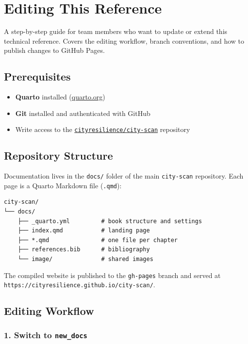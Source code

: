 \documentclass[
  letterpaper,
  DIV=11,
  numbers=noendperiod]{scrreprt}
\providecommand{\tightlist}{%
  \setlength{\itemsep}{0pt}\setlength{\parskip}{0pt}}
\begin{document}
\chapter{Editing This Reference}\label{editing-this-reference}

A step-by-step guide for team members who want to update or extend this
technical reference. Covers the editing workflow, branch conventions,
and how to publish changes to GitHub Pages.

\section{Prerequisites}\label{prerequisites}

\begin{itemize}
\tightlist
\item
  \textbf{Quarto} installed
  (\href{https://quarto.org/docs/get-started/}{quarto.org})
\item
  \textbf{Git} installed and authenticated with GitHub
\item
  Write access to the
  \href{https://github.com/cityresilience/city-scan}{\texttt{cityresilience/city-scan}}
  repository
\end{itemize}

\section{Repository Structure}\label{repository-structure-1}

Documentation lives in the \texttt{docs/} folder of the main
\texttt{city-scan} repository. Each page is a Quarto Markdown file
(\texttt{.qmd}):

\begin{verbatim}
city-scan/
└── docs/
    ├── _quarto.yml         # book structure and settings
    ├── index.qmd           # landing page
    ├── *.qmd               # one file per chapter
    ├── references.bib      # bibliography
    └── image/              # shared images
\end{verbatim}

The compiled website is published to the \texttt{gh-pages} branch and
served at \texttt{https://cityresilience.github.io/city-scan/}.

\section{Editing Workflow}\label{editing-workflow}

\subsection{\texorpdfstring{1. Switch to
\texttt{new\_docs}}{1. Switch to new\_docs}}\label{switch-to-new_docs}
\end{document}
